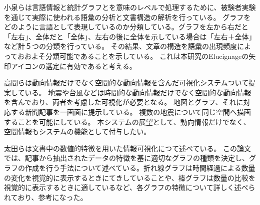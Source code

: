 \documentclass{matsushita-zemi}
\begin{document}

小泉らは言語情報と統計グラフとを意味のレベルで処理するために、被験者実験を通じて実際に使われる語彙の分析と文書構造の解析を行っている\cite{interconversion}。
グラフをどのように言語として表現しているのか分類している。グラフを左から右だと「左右」、全体だと「全体」、左右の後に全体を示している場合は「左右＋全体」など計５つの分類を行っている。
その結果、文章の構造を語彙の出現頻度によっておおよそ分類可能であることを示している。
これは本研究のElucignageの矢印アイコンの選定に有効であると考える。

高間らは動向情報だけでなく空間的な動向情報を含んだ可視化システムついて提案している\cite{SpaceTrendInformation}。
地震や台風などは時間的な動向情報だけでなく空間的な動向情報を含んでおり、両者を考慮した可視化が必要となる。
地図とグラフ、それに対応する新聞記事を一画面に提示している。
複数の地震について同じ空間へ描画することを可能にしている。
本システムの展望として、動向情報だけでなく、空間情報もシステムの機能として付与したい。

太田らは文書中の数値的特徴を用いた情報可視化につて述べている\cite{numerical_features}。
この論文では、記事から抽出されたデータの特徴を基に適切なグラフの種類を決定し、グラフの作成を行う手法について述べている。折れ線グラフは時間経過による数量の変化を視覚的に表示するときにてきしていることや、棒グラフは数量の比較を視覚的に表示するときに適しているなど、各グラフの特徴について詳しく述べられており、参考になった。
\end{document}
